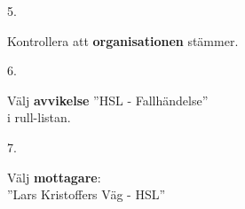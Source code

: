 \documentclass[paper=a5,DIV=15,headinclude,twoside=semi,openany,titlepage=firstiscover]{scrbook}
\begin{document}
\noindent\hrulefill

\vfill
\noindent
\begin{minipage}[t]{0.06\textwidth}
	\phantom{1}5.
\end{minipage}%
\begin{minipage}[t]{.44\textwidth}\raggedright
	Kontrollera att \textbf{organisationen} stämmer.
\end{minipage}%
\begin{minipage}[t]{.5\textwidth}
	\hfill{}
\end{minipage}
\vfill

\noindent\hrulefill

\vfill
\noindent
\begin{minipage}[t]{0.06\textwidth}
	\phantom{1}6.
\end{minipage}%
\begin{minipage}[t]{.54\textwidth}\raggedright
	Välj \textbf{avvikelse} ”HSL - Fallhändelse”\\
	i rull-listan.
\end{minipage}%
\begin{minipage}[t]{.4\textwidth}
	\hfill{}
\end{minipage}
\vfill

\noindent\hrulefill

\vfill
\noindent
\begin{minipage}[t]{0.06\textwidth}
	\phantom{1}7.
\end{minipage}%
\begin{minipage}[t]{.54\textwidth}\raggedright
	Välj \textbf{mottagare}:\\ 
	”Lars Kristoffers Väg - HSL”
\end{minipage}%
\begin{minipage}[t]{.4\textwidth}
	\hfill{}
\end{minipage}
\vfill
\end{document}
